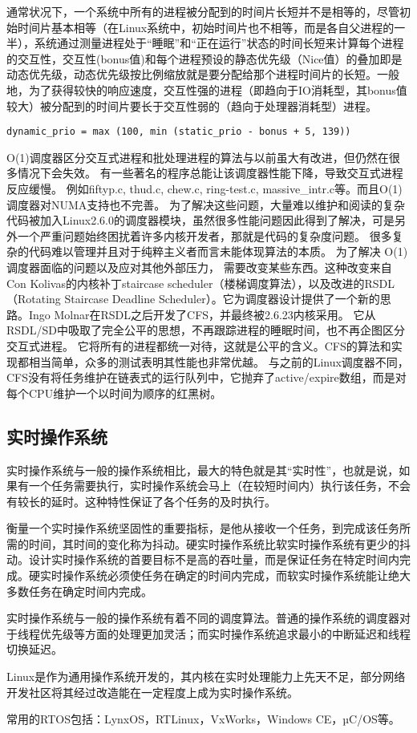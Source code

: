 通常状况下，一个系统中所有的进程被分配到的时间片长短并不是相等的，尽管初始时间片基本相等（在Linux系统中，初始时间片也不相等，而是各自父进程的一半），系统通过测量进程处于“睡眠”和“正在运行”状态的时间长短来计算每个进程的交互性，交互性(bonus值)和每个进程预设的静态优先级（Nice值）的叠加即是动态优先级，动态优先级按比例缩放就是要分配给那个进程时间片的长短。一般地，为了获得较快的响应速度，交互性强的进程（即趋向于IO消耗型，其bonus值较大）被分配到的时间片要长于交互性弱的（趋向于处理器消耗型）进程。
\begin{verbatim}
dynamic_prio = max (100, min (static_prio - bonus + 5, 139))
\end{verbatim}

  O(1)调度器区分交互式进程和批处理进程的算法与以前虽大有改进，但仍然在很多情况下会失效。
  有一些著名的程序总能让该调度器性能下降，导致交互式进程反应缓慢。
  例如fiftyp.c, thud.c, chew.c, ring-test.c, massive\_intr.c等。而且O(1)调度器对NUMA支持也不完善。
  为了解决这些问题，大量难以维护和阅读的复杂代码被加入Linux2.6.0的调度器模块，虽然很多性能问题因此得到了解决，可是另外一个严重问题始终困扰着许多内核开发者，那就是代码的复杂度问题。
  很多复杂的代码难以管理并且对于纯粹主义者而言未能体现算法的本质。
    为了解决 O(1) 调度器面临的问题以及应对其他外部压力， 需要改变某些东西。这种改变来自Con Kolivas的内核补丁staircase scheduler（楼梯调度算法），以及改进的RSDL（Rotating Staircase Deadline Scheduler）。它为调度器设计提供了一个新的思路。Ingo Molnar在RSDL之后开发了CFS，并最终被2.6.23内核采用。
	它从RSDL/SD中吸取了完全公平的思想，不再跟踪进程的睡眠时间，也不再企图区分交互式进程。
	它将所有的进程都统一对待，这就是公平的含义。CFS的算法和实现都相当简单，众多的测试表明其性能也非常优越。
	与之前的Linux调度器不同，CFS没有将任务维护在链表式的运行队列中，它抛弃了active/expire数组，而是对每个CPU维护一个以时间为顺序的红黑树。
	

\subsection{实时操作系统}

实时操作系统与一般的操作系统相比，最大的特色就是其“实时性”，也就是说，如果有一个任务需要执行，实时操作系统会马上（在较短时间内）执行该任务，不会有较长的延时。这种特性保证了各个任务的及时执行。

衡量一个实时操作系统坚固性的重要指标，是他从接收一个任务，到完成该任务所需的时间，其时间的变化称为抖动。硬实时操作系统比软实时操作系统有更少的抖动。设计实时操作系统的首要目标不是高的吞吐量，而是保证任务在特定时间内完成。硬实时操作系统必须使任务在确定的时间内完成，而软实时操作系统能让绝大多数任务在确定时间内完成。

实时操作系统与一般的操作系统有着不同的调度算法。普通的操作系统的调度器对于线程优先级等方面的处理更加灵活；而实时操作系统追求最小的中断延迟和线程切换延迟。

Linux是作为通用操作系统开发的，其内核在实时处理能力上先天不足，部分网络开发社区将其经过改造能在一定程度上成为实时操作系统。

常用的RTOS包括：LynxOS，RTLinux，VxWorks，Windows CE，µC/OS等。







